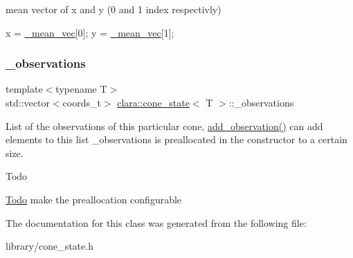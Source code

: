 mean vector of x and y (0 and 1 index respectivly) 


\begin{DoxyCode}
x = \hyperlink{classclara_1_1cone__state_abf600e69be6a3791caefb93b214bb3b5}{\_mean\_vec}[0];
y = \hyperlink{classclara_1_1cone__state_abf600e69be6a3791caefb93b214bb3b5}{\_mean\_vec}[1];
\end{DoxyCode}
 \mbox{\label{classclara_1_1cone__state_ae5c8c1ba05533a80ab1874fb878888b9}} 
\subsubsection{\texorpdfstring{\+\_\+observations}{\_observations}}
{\footnotesize\ttfamily template$<$typename T$>$ \\
std\+::vector$<$coords\+\_\+t$>$ \hyperlink{classclara_1_1cone__state}{clara\+::cone\+\_\+state}$<$ T $>$\+::\+\_\+observations}



List of the observations of this particular cone, {\ttfamily \hyperlink{classclara_1_1cone__state_aee0e3d2bf97a5b06b8a052bf4c93f6ed}{add\+\_\+observation()}} can add elements to this list {\ttfamily \+\_\+observations} is preallocated in the constructor to a certain size. 

\begin{DoxyRefDesc}{Todo}
\item[\hyperlink{todo__todo000009}{Todo}]make the preallocation configurable \end{DoxyRefDesc}


The documentation for this class was generated from the following file\+:\begin{DoxyCompactItemize}
\item 
library/cone\+\_\+state.\+h\end{DoxyCompactItemize}
